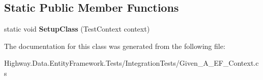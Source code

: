 \subsection*{Static Public Member Functions}
\begin{DoxyCompactItemize}
\item 
\hypertarget{class_highway_1_1_data_1_1_entity_framework_1_1_tests_1_1_integration_tests_1_1_given___a___e_f___context_a3fecdb176cac138e8e0bd7ae98ec9f6a}{static void {\bfseries Setup\-Class} (Test\-Context context)}\label{class_highway_1_1_data_1_1_entity_framework_1_1_tests_1_1_integration_tests_1_1_given___a___e_f___context_a3fecdb176cac138e8e0bd7ae98ec9f6a}

\end{DoxyCompactItemize}


The documentation for this class was generated from the following file\-:\begin{DoxyCompactItemize}
\item 
Highway.\-Data.\-Entity\-Framework.\-Tests/\-Integration\-Tests/Given\-\_\-\-A\-\_\-\-E\-F\-\_\-\-Context.\-cs\end{DoxyCompactItemize}
